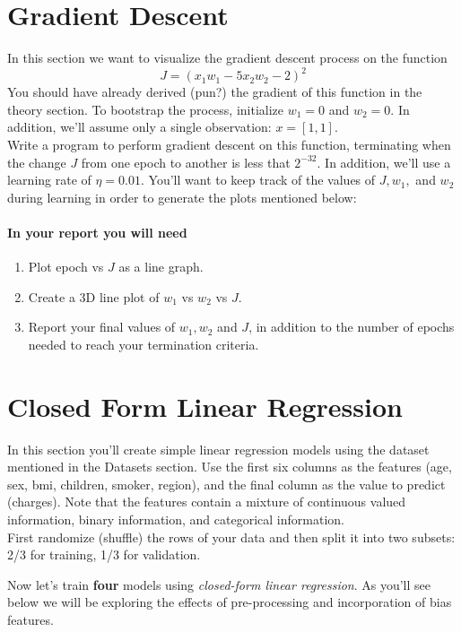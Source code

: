 \documentclass[12pt]{article}
\begin{document}
\newpage
\section{Gradient Descent}\label{gd}
In this section we want to visualize the gradient descent process on the function $$J=(x_1 w_1 -5x_2 w_2-2)^2$$
\noindent
You should have already derived (pun?) the gradient of this function in the theory section.  To bootstrap the process, initialize $w_1=0$ and $w_2=0$.  In addition, we'll assume only a single observation: $x=[1, 1]$.\\  

\noindent
Write a program to perform gradient descent on this function, terminating when the change $J$ from one epoch to another is less that $2^{-32}$.  In addition, we'll use a learning rate of $\eta=0.01$.  You'll want to keep track of the values of $J, w_1, $ and $w_2$ during learning in order to generate the plots mentioned below:

\paragraph{In your report you will need}
\begin{enumerate}
\item Plot epoch vs $J$ as a line graph.
\item Create a 3D line plot of $w_1$ vs $w_2$ vs $J$.
\item Report your final values of $w_1, w_2$ and $J$, in addition to the number of epochs needed to reach your termination criteria.
\end{enumerate}


\newpage
\section{Closed Form Linear Regression}\label{linreg}
In this section you'll create simple linear regression models using the dataset mentioned in the Datasets section.  Use the first six columns as the features (age, sex, bmi, children, smoker, region), and the final column as the value to predict (charges).  Note that the features contain a mixture of continuous valued information, binary information, and categorical information.\\

\noindent
First randomize (shuffle) the rows of your data and then split it into two subsets: 2/3 for training, 1/3 for validation.

\noindent
Now let's train \textbf{four} models using \emph{closed-form linear regression}.  As you'll see below we will be exploring the effects of pre-processing and incorporation of bias features.
\end{document}
